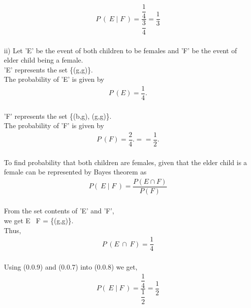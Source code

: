 \documentclass[journal,12pt,twocolumn]{IEEEtran}
\begin{document}
    \hspace{25}\begin{align} P\ (\ E\;|\;F\  ) = \dfrac{\dfrac{1}{4}}{\dfrac{3}{4}} = \dfrac{1}{3}\end{align}\\ 
 
ii) Let 'E' be the event of both children to be females and 'F' be the event of elder child being a female.\\
    
\hspace{25}    'E' represents the set \{(g,g)\}.\\
    
\hspace{25}    The probability of 'E' is given by \begin{align}P\ (E) = \dfrac {1}{4}.\end{align}\\
    
    
\hspace{25}    'F' represents the set \{(b,g), (g,g)\}.\\
    
    The probability of 'F' is given by \begin{align}P\ (F) = \dfrac {2}{4}. = = \dfrac {1}{2}.\end{align}\\
    
    To find probability that both children are females, given that the elder child is
    a female can be represented by Bayes theorem as\\
    
    \begin{align}P (\ E\;|\;F\  ) = \dfrac{P (E \cap F)}{P (F)}\end{align}\\
    
    From the set contents of 'E' and 'F',\\ we get E \cap\ F = \{(g,g)\}.\\
    
    Thus, \begin{align}P\ (E\ \cap\ F) = \dfrac{1}{4}\end{align}\\
    
    Using (0.0.9) and (0.0.7) into (0.0.8) we get, \begin{align}P (\ E\;|\;F\  )
    = \dfrac{\dfrac{1}{4}}{\dfrac{1}{2}} = \dfrac{1}{2}\end{align}\\    
\end{document}
